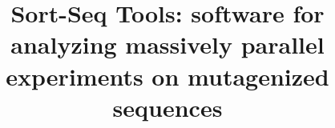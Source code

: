 \documentclass{bmcart}
\begin{document}
\begin{frontmatter}

\begin{fmbox}


\title{Sort-Seq Tools: software for analyzing massively parallel experiments on mutagenized sequences}



\author[
   addressref={aff1},                   %
   email={wireland@caltech.edu}   %
]{ }
\author[
   addressref={aff2},
   email={phillips@pboc.caltech.edu}
]{ }
\author[
   addressref={aff3},                   %
   corref={aff3},                       %
   email={jkinney@cshl.edu}   %
]{ }



\address[id=aff1]{%
  , %
  ,                                %
  ,                              %
}
\address[id=aff2]{%
  , 
  ,                               
  ,                        
}
\address[id=aff3]{%
  ,
  ,
  ,
}


\end{fmbox}
\end{frontmatter}
\end{document}
